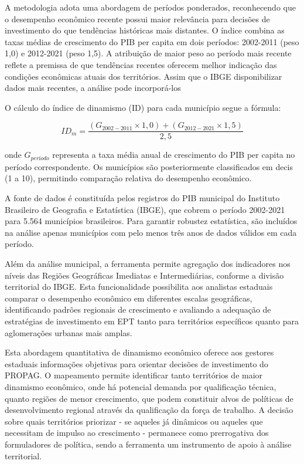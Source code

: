 A metodologia adota uma abordagem de períodos ponderados, reconhecendo que o desempenho econômico recente possui maior relevância para decisões de investimento do que tendências históricas mais distantes. O índice combina as taxas médias de crescimento do PIB per capita em dois períodos: 2002-2011 (peso 1,0) e 2012-2021 (peso 1,5). A atribuição de maior peso ao período mais recente reflete a premissa de que tendências recentes oferecem melhor indicação das condições econômicas atuais dos territórios. Assim que o IBGE disponibilizar dados mais recentes, a análise pode incorporá-los


O cálculo do índice de dinamismo (ID) para cada município segue a fórmula:

$$ID_m = \frac{(G_{2002-2011} \times 1,0) + (G_{2012-2021} \times 1,5)}{2,5}$$

onde $G_{período}$ representa a taxa média anual de crescimento do PIB per capita no período correspondente. Os municípios são posteriormente classificados em decis (1 a 10), permitindo comparação relativa do desempenho econômico.

A fonte de dados é constituída pelos registros do PIB municipal do Instituto Brasileiro de Geografia e Estatística (IBGE), que cobrem o período 2002-2021 para 5.564 municípios brasileiros. Para garantir robustez estatística, são incluídos na análise apenas municípios com pelo menos três anos de dados válidos em cada período.

Além da análise municipal, a ferramenta permite agregação dos indicadores nos níveis das Regiões Geográficas Imediatas e Intermediárias, conforme a divisão territorial do IBGE. Esta funcionalidade possibilita aos analistas estaduais comparar o desempenho econômico em diferentes escalas geográficas, identificando padrões regionais de crescimento e avaliando a adequação de estratégias de investimento em EPT tanto para territórios específicos quanto para aglomerações urbanas mais amplas.

Esta abordagem quantitativa de dinamismo econômico oferece aos gestores estaduais informações objetivas para orientar decisões de investimento do PROPAG. O mapeamento permite identificar tanto territórios de maior dinamismo econômico, onde há potencial demanda por qualificação técnica, quanto regiões de menor crescimento, que podem constituir alvos de políticas de desenvolvimento regional através da qualificação da força de trabalho. A decisão sobre quais territórios priorizar - se aqueles já dinâmicos ou aqueles que necessitam de impulso ao crescimento - permanece como prerrogativa dos formuladores de política, sendo a ferramenta um instrumento de apoio à análise territorial.


